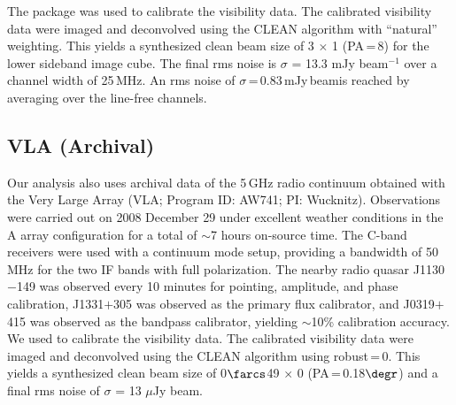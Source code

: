 \documentclass[]{emulateapj}
\begin{document}
The  package was used to calibrate the visibility data.
The calibrated visibility data were
imaged and deconvolved using the CLEAN algorithm with ``natural'' weighting. This yields a synthesized clean
beam size of 3 $\times$ 1 (PA\,=\,8\degr) for the lower sideband
image cube. The final rms noise is $\sigma$ = 13.3 mJy beam$^{-1}$
over a channel width of 25\,MHz. An rms noise of
$\sigma$\,=\,0.83\,mJy\,beam\pmOne is reached by averaging over the
line-free channels.

\subsection{VLA (Archival)} %
Our analysis also uses archival data of the 5\,GHz
radio continuum obtained with the
Very Large Array (VLA; Program ID: AW741; PI: Wucknitz).
Observations were carried out on 2008 December 29 under excellent weather
conditions in the A array configuration for a total of $\sim$7 hours on-source time. The C-band receivers were used with a continuum mode setup,
providing a bandwidth of 50 MHz for the two IF bands with full polarization.
The nearby radio quasar J1130$-$149 was observed every 10 minutes for
pointing, amplitude, and phase calibration, J1331$+$305 was observed as the
primary flux calibrator, and J0319$+$415 was observed as the bandpass
calibrator, yielding $\sim$10\% calibration accuracy.
We used  to calibrate the visibility data.
The calibrated visibility data were imaged and deconvolved using
the CLEAN algorithm using robust\,=\,0. This yields a synthesized clean
beam size of 0$\farcs$49 $\times$ 0 (PA\,=\,0.18$\degr$) and a final
rms noise of $\sigma$ = 13 $\mu$Jy beam\pmOne.
\end{document}
